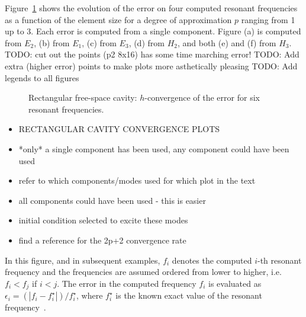 Figure~\ref{fig:rectangle2DfreeSpace_Convergence} shows the evolution of the
error on four computed resonant frequencies as a function of the element size
for a degree of approximation $p$ ranging from 1 up to 3. Each error is computed
from a single component. Figure (a) is computed from $E_2$, (b) from $E_1$, (c)
from $E_3$, (d) from $H_2$, and both (e) and (f) from $H_3$.
TODO: cut out the points (p2 8x16) has some time marching error!
TODO: Add extra (higher error) points to make plots more asthetically pleasing
TODO: Add legends to all figures
\begin{figure}[!ht]
	\centering

	\caption{Rectangular free-space cavity: $h$-convergence of the error for six resonant frequencies.}
	\label{fig:rectangle2DfreeSpace_Convergence}
\end{figure}
\begin{itemize}
\item RECTANGULAR CAVITY CONVERGENCE PLOTS
\item *only* a single component has been used, any component could have been used
\item refer to which components/modes used for which plot in the text
\item all components could have been used - this is easier
\item initial condition selected to excite these modes
\item find a reference for the 2p+2 convergence rate
\end{itemize}
In this figure, and in subsequent examples, $f_i$ denotes the computed $i$-th resonant frequency and the frequencies are assumed ordered from lower to higher, i.e. $f_i < f_j$ if $i<j$. The error in the computed frequency $f_i$ is evaluated as $\epsilon_i = (|f_i - f_i^\star|)/f_i^\star$, where $f_i^\star$ is the known exact value of the resonant frequency~\cite{BalanisBook}.

